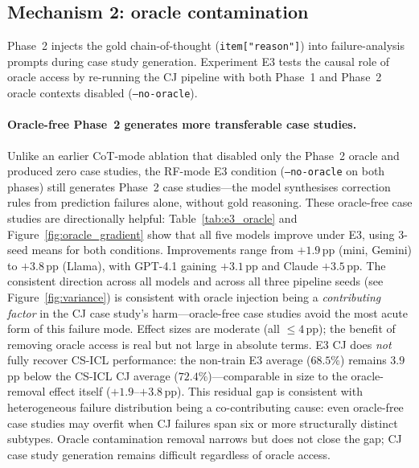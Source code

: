 \documentclass{article}
\begin{document}
\subsection{Mechanism 2: oracle contamination}
\label{sec:oracle}

Phase~2 injects the gold chain-of-thought (\texttt{item["reason"]}) into failure-analysis
prompts during case study generation.
Experiment E3 tests the causal role of oracle access by re-running the CJ pipeline with
both Phase~1 and Phase~2 oracle contexts disabled (\texttt{--no-oracle}).

\paragraph{Oracle-free Phase~2 generates more transferable case studies.}
Unlike an earlier CoT-mode ablation that disabled only the Phase~2 oracle and produced zero
case studies, the RF-mode E3 condition (\texttt{--no-oracle} on both phases) still generates
Phase~2 case studies---the model synthesises correction rules from prediction failures alone,
without gold reasoning.
These oracle-free case studies are directionally helpful: Table~\ref{tab:e3_oracle} and
Figure~\ref{fig:oracle_gradient} show that all five models improve under E3, using 3-seed
means for both conditions.
Improvements range from $+1.9$\,pp (mini, Gemini) to $+3.8$\,pp (Llama), with GPT-4.1 gaining
$+3.1$\,pp and Claude $+3.5$\,pp.
The consistent direction across all models and across all three pipeline seeds
(see Figure~\ref{fig:variance}) is consistent with oracle injection being a
\emph{contributing factor} in the CJ case study's harm---oracle-free case studies avoid the
most acute form of this failure mode.
Effect sizes are moderate (all $\leq 4$\,pp); the benefit of removing oracle access is real
but not large in absolute terms.
E3 CJ does \emph{not} fully recover CS-ICL performance: the non-train E3 average
($68.5\%$) remains $3.9$\,pp below the CS-ICL CJ average ($72.4\%$)---comparable in size to
the oracle-removal effect itself ($+1.9$--$+3.8$\,pp).
This residual gap is consistent with heterogeneous failure distribution being a co-contributing
cause: even oracle-free case studies may overfit when CJ failures span six or more structurally
distinct subtypes.
Oracle contamination removal narrows but does not close the gap; CJ case study generation
remains difficult regardless of oracle access.
\end{document}
